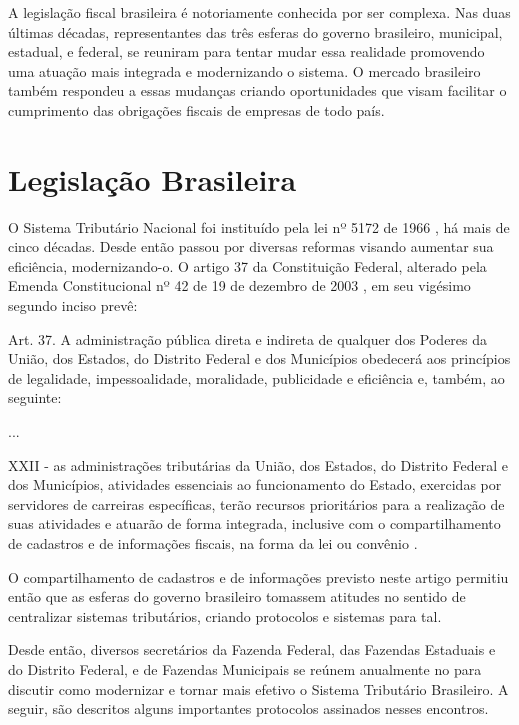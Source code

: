 
A legislação fiscal brasileira é notoriamente conhecida por ser complexa. Nas duas últimas décadas, representantes das três esferas do governo brasileiro, municipal, estadual, e federal, se reuniram para tentar mudar essa realidade promovendo uma atuação mais integrada e modernizando o sistema. O mercado brasileiro também respondeu a essas mudanças criando oportunidades que visam facilitar o cumprimento das obrigações fiscais de empresas de todo país.

\section{Legislação Brasileira}
\label{section:documentos-fiscais:legislacao}

O Sistema Tributário Nacional foi instituído pela lei nº 5172 de 1966 \cite{lei:5172:codigo-tributario}, há mais de cinco décadas. Desde então passou por diversas reformas visando aumentar sua eficiência, modernizando-o. O artigo 37 da Constituição Federal, alterado pela Emenda Constitucional nº 42 de 19 de dezembro de 2003 \cite{constituicao:emenda42_2003}, em seu vigésimo segundo inciso prevê:

\begin{citacao}
Art. 37. A administração pública direta e indireta de qualquer dos Poderes da União, dos Estados, do Distrito Federal e dos Municípios obedecerá aos princípios de legalidade, impessoalidade, moralidade, publicidade e eficiência e, também, ao seguinte:

...

XXII - as administrações tributárias da União, dos Estados, do Distrito Federal e dos Municípios, atividades essenciais ao funcionamento do Estado, exercidas por servidores de carreiras específicas, terão recursos prioritários para a realização de suas atividades e atuarão de forma integrada, inclusive com o compartilhamento de cadastros e de informações fiscais, na forma da lei ou convênio \cite{constituicao:1988}.
\end{citacao}

O compartilhamento de cadastros e de informações previsto neste artigo permitiu então que as esferas do governo brasileiro tomassem atitudes no sentido de centralizar sistemas tributários, criando protocolos e sistemas para tal.

Desde então, diversos secretários da Fazenda Federal, das Fazendas Estaduais e do Distrito Federal, e de Fazendas Municipais se reúnem anualmente no  para discutir como modernizar e tornar mais efetivo o Sistema Tributário Brasileiro. A seguir, são descritos alguns importantes protocolos assinados nesses encontros.

